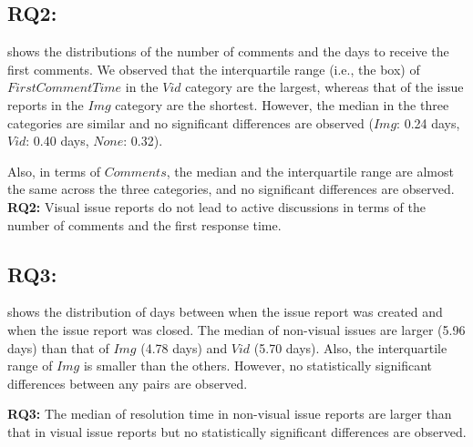\subsection*{RQ2: \RQtwo{}}


 shows the distributions of the number of comments and the days to receive the first comments. 
We observed that the interquartile range (i.e., the box) of $FirstCommentTime$ in the $Vid$ category are the largest, whereas that of the issue reports in the $Img$ category are the shortest. 
However, the median in the three categories are similar and no significant differences are observed ($Img$: 0.24 days, $Vid$: 0.40 days, $None$: 0.32). 

Also, in terms of $Comments$, the median and the interquartile range are almost the same across the three categories, and no significant differences are observed. 
\vspace{-0.2cm}%
\summarybox
{{\bf RQ2: }{
    Visual issue reports do not lead to active discussions in terms of the number of comments and the first response time. 
}}
\subsection*{RQ3: \RQthree{}}
 shows the distribution of days between when the issue report was created and when the issue report was closed. The median of non-visual issues are larger (5.96 days) than that of $Img$ (4.78 days) and $Vid$ (5.70 days). Also, the interquartile range of $Img$ is smaller than the others. However, no statistically significant differences between any pairs are observed.  

\vspace{-0.2cm}%
\summarybox
{{\bf RQ3: }{
The median of resolution time in non-visual issue reports are larger than that in visual issue reports but no statistically significant differences are observed. 
}}




